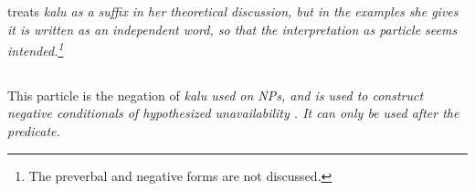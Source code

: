 





\citet{Jayasuriya2002} treats \em kalu \em as a suffix in her theoretical discussion, but in the examples she gives it is written as an independent word, so that the interpretation as particle seems intended.\footnote{The preverbal and negative forms are not discussed.}





\subsection{}\label{sec:wc:kalthra}
This particle is the negation of \em kalu \em used on NPs, and is used to construct negative conditionals of hypothesized unavailability  .  It can only be used after the predicate.



